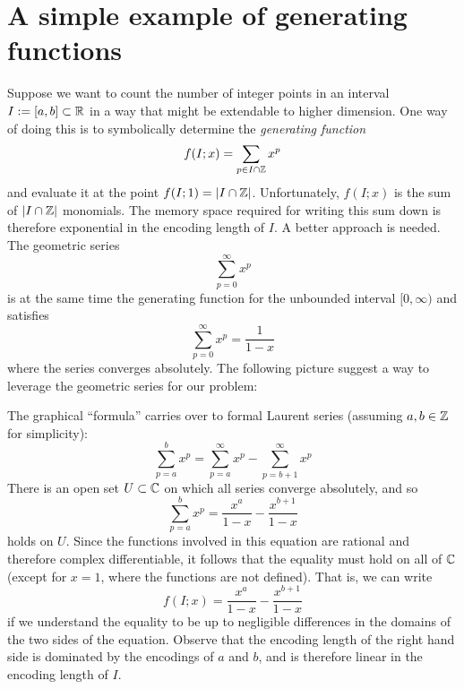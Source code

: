 \section{A simple example of generating functions}
\label{sec:simple-example-generating-functions}

Suppose we want to count the number of integer points in an interval $I := [a,b] \subset \mathbb{R}$
in a way that might be extendable to higher dimension.
One way of doing this is to symbolically determine the \emph{generating function}
\[
  f(I;x) = \sum_{p \in I \cap \mathbb{Z}} x^p
\]
and evaluate it at the point $f(I;1) = |I \cap \mathbb{Z}|$.
Unfortunately, $f(I;x)$ is the sum of $|I \cap \mathbb{Z}|$ monomials.
The memory space required for writing this sum down is therefore exponential in the encoding length of $I$.
A better approach is needed. The geometric series
\[
  \sum_{p = 0}^\infty x^p
\]
is at the same time the generating function for the unbounded interval $[0,\infty)$
and satisfies
\[
  \sum_{p = 0}^\infty x^p = \frac{1}{1 - x}
\]
where the series converges absolutely.
The following picture suggest a way to leverage the geometric series for our problem:
\begin{center}
\end{center}
The graphical ``formula'' carries over to formal Laurent series (assuming $a, b \in \mathbb{Z}$ for simplicity):
\[
  \sum_{p = a}^b x^p = \sum_{p = a}^\infty x^p - \sum_{p = b+1}^\infty x^p
\]
There is an open set $U \subset \mathbb{C}$ on which all series converge absolutely,
and so
\[
  \sum_{p = a}^b x^p = \frac{x^a}{1 - x} - \frac{x^{b + 1}}{1 - x}
\]
holds on $U$.
Since the functions involved in this equation are rational and therefore complex differentiable,
it follows that the equality must hold on all of $\mathbb{C}$ (except for $x = 1$, where the functions are not defined).
That is, we can write
\[
  f(I;x) = \frac{x^a}{1 - x} - \frac{x^{b + 1}}{1 - x}
\]
if we understand the equality to be up to negligible differences in the domains of the two sides of the equation.
Observe that the encoding length of the right hand side is dominated by the encodings of $a$ and $b$,
and is therefore linear in the encoding length of $I$.

